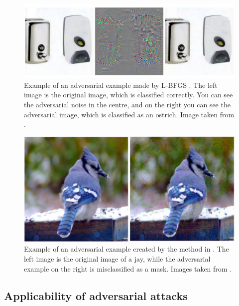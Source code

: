 \begin{figure}[ht]
    \centering
    \includegraphics[width=1\textwidth]{graphics/lbfgs.PNG}
    \caption[Example of an adversarial example created by L-BFGS.]{Example of an adversarial example made by L-BFGS \cite{szegedy2014intriguing}. The left image is the original image, which is classified correctly. You can see the adversarial noise in the centre, and on the right you can see the adversarial image, which is classified as an ostrich. Image taken from \cite{szegedy2014intriguing}.}
    \label{fig:lbfgs}
\end{figure}

\begin{figure}[ht]
    \centering
    \includegraphics[width=1\textwidth]{graphics/jay_adv_example.PNG}
    \caption[Example of an adversarial example created by \cite{Moosavi-Dezfooli_2017_CVPR}.]{Example of an adversarial example created by the method in \cite{Moosavi-Dezfooli_2017_CVPR}. The left image is the original image of a jay, while the adversarial example on the right is misclassified as a mask. Images taken from \cite{akhtar}.}
    \label{fig:jay_adv_example}
\end{figure}

\subsection{Applicability of adversarial attacks}
  
